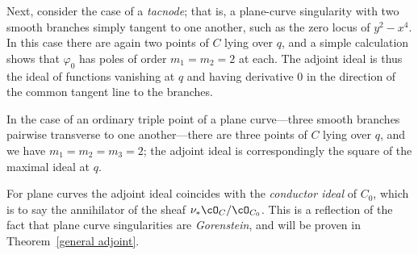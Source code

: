 \begin{example}[tacnodes]
Next, consider the case of a \emph{tacnode}; that is, a plane-curve singularity with two smooth branches simply tangent to one another, such as the zero locus of $y^2-x^4$. In this case there are again two points of $C$ lying over $q$, and a simple calculation shows that $\varphi_0$ has poles of order $m_1=m_2=2$ at each. The adjoint ideal is thus the ideal of functions vanishing at $q$ and having derivative 0 in the direction of the common tangent line to the branches.
\end{example}

\begin{example}
In the case of an ordinary triple point of a plane curve---three smooth branches pairwise transverse to one another---there are three points of $C$ lying over $q$, and we have $m_1=m_2=m_3= 2$; the adjoint ideal is correspondingly 
 the square of the maximal ideal at $q$. 
\end{example}

For plane curves the adjoint ideal coincides with the 
\emph{conductor ideal} of $C_0$, which is to say the annihilator of the sheaf $\nu_*\cO_C / \cO_{C_0}$. This is a reflection of the fact that plane curve singularities are \emph{Gorenstein}, and will be proven in Theorem~\ref{general adjoint}.


